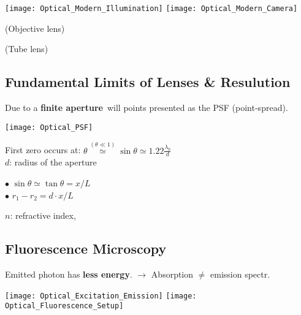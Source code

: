 \texttt{[image: Optical\_Modern\_Illumination]}
\hfill
\texttt{[image: Optical\_Modern\_Camera]}

\parbox{.5\columnwidth}{\centering\small(Objective lens)}
\parbox{.5\columnwidth}{\centering\small(Tube lens)}
\subsection{Fundamental Limits of Lenses \& Resulution}
%
Due to a \textbf{finite aperture} will points presented as the PSF (point-spread).

\begin{minipage}{.3\columnwidth}
\texttt{[image: Optical\_PSF]}
\end{minipage}%
\hspace{1.5\boxmargin}%
\begin{minipage}{.7\columnwidth-1.5\boxmargin}
First zero occurs at: \quad
$\theta \overset{(\theta\ll1)}{\simeq} \sin\theta \simeq 1.22\frac{\lambda_0}{d}$\\
$d$: radius of the aperture\par
$\bullet$ $\sin\theta \simeq \tan\theta = x/L$\\
$\bullet$ $r_1 - r_2 = d\cdot x/L$
\end{minipage}

\quad $n$: refractive index,
\subsection{Fluorescence Microscopy}
%
Emitted photon has \textbf{less energy}.
$\to$ Absorption $\neq$ emission spectr.

\texttt{[image: Optical\_Excitation\_Emission]}
\texttt{[image: Optical\_Fluorescence\_Setup]}
